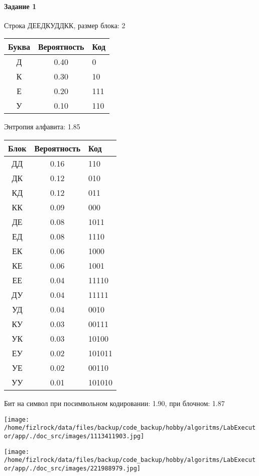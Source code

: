 \documentclass[a4paper, 12pt]{article}
\begin{document}
\paragraph{Задание 1}

Строка ДЕЕДКУДДКК, размер блока: 2
\begin{center}
 \begin{tabular}{ |c|c|l| } 
  \hline
     Буква & Вероятность & Код\\ \hline
Д & 0.40 & 0\\\hline
К & 0.30 & 10\\\hline
Е & 0.20 & 111\\\hline
У & 0.10 & 110
\\ \hline \end{tabular}
\end{center}
Энтропия алфавита: 1.85
\begin{center}
 \begin{tabular}{ |c|c|l| } 
  \hline
     Блок & Вероятность & Код\\ \hline
ДД & 0.16 & 110\\\hline
ДК & 0.12 & 010\\\hline
КД & 0.12 & 011\\\hline
КК & 0.09 & 000\\\hline
ДЕ & 0.08 & 1011\\\hline
ЕД & 0.08 & 1110\\\hline
ЕК & 0.06 & 1000\\\hline
КЕ & 0.06 & 1001\\\hline
ЕЕ & 0.04 & 11110\\\hline
ДУ & 0.04 & 11111\\\hline
УД & 0.04 & 0010\\\hline
КУ & 0.03 & 00111\\\hline
УК & 0.03 & 10100\\\hline
ЕУ & 0.02 & 101011\\\hline
УЕ & 0.02 & 00110\\\hline
УУ & 0.01 & 101010
\\ \hline \end{tabular}
\end{center}
Бит на символ при посимвольном кодировании: 1.90, при блочном: 1.87

\texttt{[image: /home/fizlrock/data/files/backup/code\_backup/hobby/algoritms/LabExecutor/app/./doc\_src/images/1113411903.jpg]}

\texttt{[image: /home/fizlrock/data/files/backup/code\_backup/hobby/algoritms/LabExecutor/app/./doc\_src/images/221988979.jpg]}
\end{document}
